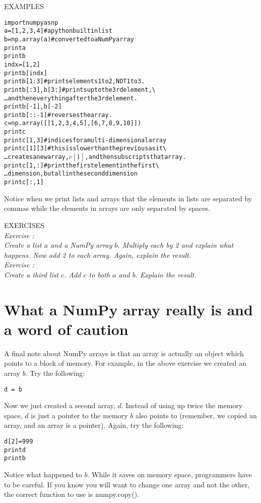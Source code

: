 {\color{blue} {\sf\small EXAMPLES}} \\
\begin{alltt}
\pytab import numpy as np
\pytab a = [1,2,3,4]      #a python built in list 
\pytab b = np.array(a)     #converted to a NumPy array 
\pytab print a 
\pytab print b 
\pytab indx = [1,2] 
\pytab print b[indx]  
\pytab print b[1:3]       #prints elements 1 to 2, NOT 1 to 3.  
\pytab print b[:3], b[3:] #prints up to the 3rd element, \textbackslash
\ldots    and then everything after the 3rd element.
\pytab print b[-1],b[-2] 
\pytab print b[::-1]      #reverses the array.  
\pytab c = np.array([[1,2,3,4,5],[6,7,8,9,10]]) 
\pytab print c 
\pytab print c[1,3]       #indices for a multi-dimensional array 
\pytab print c[1][3]      #this is slower than the previous as it \textbackslash
\ldots    creates a new array, $c[1]$, and then subscripts that array.
\pytab print c[1,:]  #print the first element in the first \textbackslash
\ldots    dimension, but all in the second dimension
\pytab print c[:,1] 
\end{alltt}
Notice when we print lists and arrays that the elements in lists are
separated by commas while the elements in arrays are only separated by
spaces.

{\color{blue} {\sf\small EXERCISES}} \\
{\it Exercise  :  \\
  Create a list $a$ and a NumPy array $b$.  Multiply each by 2 and
  explain what happens.  Now add 2 to each array.  Again, explain the
  result.  } \\
{\it Exercise  :  \\
  Create a third list $c$.  Add $c$ to both $a$ and
  $b$.  Explain the result.}

\section{What a NumPy array really is and a word of caution}

A final note about NumPy arrays is that an array is actually
an object which points to a block of memory.  For example, in the
above exercise we created an array $b$.  Try the following:

\texttt{\pytab d = b}

Now we just created a second array, $d$.  Instead of using up twice
the memory space, $d$ is just a pointer to the memory $b$ also points
to (remember, we copied an array, and an array is a pointer).  Again,
try the following:
\begin{alltt}
\pytab d[2] = 999 
\pytab print d 
\pytab print b 
\end{alltt}
Notice what happened to $b$.  While it saves on memory space,
programmers have to be careful.  If you know you will want to change
one array and not the other, the correct function to use is {\sf
  numpy.copy()}.

